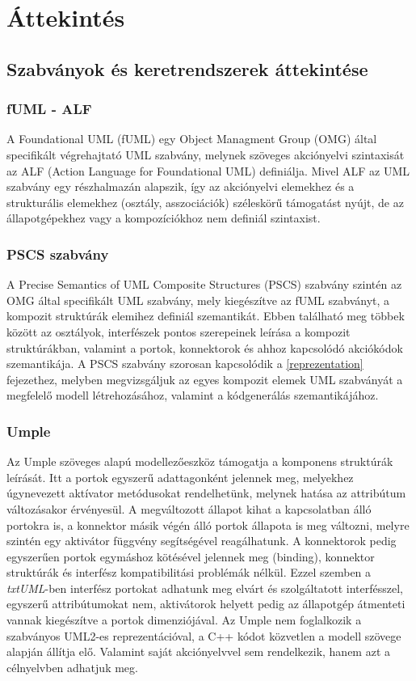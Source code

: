 \documentclass[a4paper,12pt]{report}
\begin{document}
\chapter{Áttekintés}

\section{Szabványok és keretrendszerek áttekintése}
\subsection{fUML - ALF}
A Foundational UML (fUML) \cite{fmul} egy Object Managment Group (OMG) által specifikált végrehajtató UML szabvány, 
melynek szöveges akciónyelvi szintaxisát az ALF (Action Language for Foundational UML) \cite{alf} definiálja.
Mivel ALF az UML szabvány egy részhalmazán alapszik, így az akciónyelvi elemekhez és a strukturális elemekhez (osztály, asszociációk)  széleskörű támogatást nyújt, de az állapotgépekhez vagy a kompozíciókhoz nem definiál szintaxist.

\subsection{PSCS szabvány}
A  Precise Semantics of UML Composite Structures (PSCS)  szabvány \cite{pscs} szintén az OMG által specifikált UML szabvány, mely kiegészítve az fUML szabványt, a kompozit struktúrák elemihez definiál szemantikát. Ebben található meg többek között az osztályok, interfészek pontos szerepeinek leírása a kompozit struktúrákban, valamint a portok, konnektorok és ahhoz kapcsolódó akciókódok szemantikája. A PSCS szabvány szorosan kapcsolódik a \ref{reprezentation} fejezethez, melyben megvizsgáljuk az egyes kompozit elemek UML szabványát a megfelelő modell létrehozásához, valamint a kódgenerálás szemantikájához.

\subsection{Umple}
Az Umple \cite{umple} szöveges alapú modellezőeszköz támogatja a komponens struktúrák leírását. Itt a portok egyszerű adattagonként jelennek meg, melyekhez úgynevezett aktívator metódusokat rendelhetünk, melynek hatása az attribútum változásakor érvényesül. A megváltozott állapot kihat a kapcsolatban álló portokra is, a konnektor másik végén álló portok állapota is meg változni, melyre szintén egy aktivátor függvény segítségével reagálhatunk. A konnektorok pedig egyszerűen portok egymáshoz kötésével jelennek meg (binding), konnektor struktúrák és interfész kompatibilitási problémák nélkül. Ezzel szemben a \textit{txtUML}-ben interfész portokat adhatunk meg elvárt és szolgáltatott interfésszel, egyszerű attribútumokat nem, aktivátorok helyett pedig az állapotgép átmenteti vannak kiegészítve a portok dimenziójával. Az Umple nem foglalkozik a szabványos UML2-es reprezentációval, a C++ kódot közvetlen a modell szövege alapján állítja elő. Valamint saját akciónyelvvel sem rendelkezik, hanem azt a célnyelvben adhatjuk meg. \\
\end{document}
